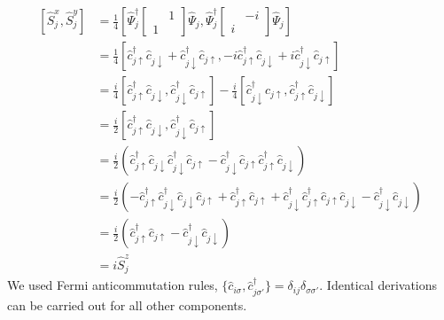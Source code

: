 \[
\begin{aligned}
	\left[ \hat S_j^x, \hat S_j^y \right] &= \frac{1}{4} \left[
		\hat \Psi_j^\dagger \begin{bmatrix}
			& 1 \\
			1 &
		\end{bmatrix} \hat \Psi_j, \hat \Psi_j^\dagger \begin{bmatrix}
			& -i \\
			i &
		\end{bmatrix} \hat \Psi_j
	\right] \\
	&= \frac{1}{4} \left[
		\hat c_{j\uparrow}^\dagger \hat c_{j\downarrow} + \hat c_{j\downarrow}^\dagger \hat c_{j\uparrow}, -i\hat c_{j\uparrow}^\dagger \hat c_{j\downarrow} + i \hat c_{j\downarrow}^\dagger \hat c_{j\uparrow}
	\right] \\
	&= \frac{i}{4} \left[
		\hat c_{j\uparrow}^\dagger \hat c_{j\downarrow}, \hat c_{j\downarrow}^\dagger \hat c_{j\uparrow}
	\right] - \frac{i}{4} \left[
		\hat c_{j\downarrow}^\dagger \hat c_{j\uparrow}, \hat c_{j\uparrow}^\dagger \hat c_{j\downarrow}
	\right] \\
	&= \frac{i}{2} \left[
		\hat c_{j\uparrow}^\dagger \hat c_{j\downarrow}, \hat c_{j\downarrow}^\dagger \hat c_{j\uparrow}
	\right] \\
	&= \frac{i}{2} \left(
		\hat c_{j\uparrow}^\dagger \hat c_{j\downarrow} \hat c_{j\downarrow}^\dagger \hat c_{j\uparrow} - \hat c_{j\downarrow}^\dagger \hat c_{j\uparrow} \hat c_{j\uparrow}^\dagger \hat c_{j\downarrow}
	\right) \\
	&= \frac{i}{2} \left(
		- \hat c_{j\uparrow}^\dagger \hat c_{j\downarrow}^\dagger \hat c_{j\downarrow} \hat c_{j\uparrow} + \hat c_{j\uparrow}^\dagger \hat c_{j\uparrow} + \hat c_{j\downarrow}^\dagger \hat c_{j\uparrow}^\dagger \hat c_{j\uparrow} \hat c_{j\downarrow} - \hat c_{j\downarrow}^\dagger \hat c_{j\downarrow}
	\right) \\
	&= \frac{i}{2} \left( 
		\hat c_{j\uparrow}^\dagger \hat c_{j\uparrow} - \hat c_{j\downarrow}^\dagger \hat c_{j\downarrow}
	\right) \\
	&= i \hat S_j^z
\end{aligned}
\]
We used Fermi anticommutation rules, $\lbrace \hat c_{i\sigma}, \hat c_{j\sigma'}^\dagger \rbrace = \delta_{ij} \delta_{\sigma\sigma'}$. Identical derivations can be carried out for all other components.


